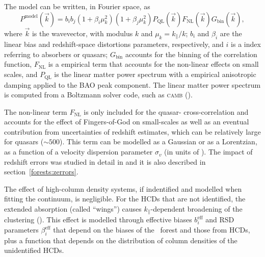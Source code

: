 The model can be written, in Fourier space, as 
\begin{equation}
    P^\mathrm{model}(\vec{k}) = b_i b_j 
        \left(1+\beta_i \mu^2_k\right) \left(1+\beta_j \mu^2_k\right) 
        P_\mathrm{ QL}(\vec{k}) F_\mathrm{NL}(\vec{k})G_\mathrm{ bin}(\vec{k}), 
    \label{eq:power_spectrum}
\end{equation}
where $\vec{k}$ is the wavevector, with modulus $k$ and $\mu_k = k_\parallel/k$;
$b_i$ and $\beta_i$ are the linear bias and redshift-space distortions parameters, respectively,
and $i$ is a index referring to absorbers or quasars; 
$G_\mathrm{ bin}$ accounts for the binning of the correlation function, 
$F_\mathrm{NL}$ is a empirical term that accounts for the non-linear effects on small scales, 
and $ P_\mathrm{ QL}$ is the linear matter power spectrum with a empirical anisotropic 
damping applied to the BAO peak component. 
The linear matter power spectrum is computed from a Boltzmann solver code, 
such as \textsc{camb} (\cite{lewisEfficientComputationCosmic2000}). 

The non-linear term $F_\mathrm{NL}$ is only included for the quasar-\lya 
cross-correlation and accounts for the effect of Fingers-of-God on small-scales as well as 
an eventual contribution from uncertainties of redshift estimates,
which can be relatively large for quasars ($\sim 500$\kms). 
This term can be modelled as a Gaussian or as a Lorentzian, as a function of a 
velocity dispersion parameter $\sigma_v$ (in units of \kms).
The impact of redshift errors was studied in detail in 
\cite{youlesEffectQuasarRedshift2022} and it is also described in 
section~\ref{forests:zerrors}.

The effect of high-column density systems, if indentified and modelled 
when fitting the continuum, is negligible. For the HCDs that are 
not identified, the extended absorption (called ``wings'') causes 
$k_\parallel$-dependent broadening of the clustering 
(\cite{font-riberaEffectHighColumn2012,
rogersCorrelationsThreedimensionalLymanalpha2018}). 
This effect is modelled through effective biases $b_i^\mathrm{eff}$ 
and RSD parameters $\beta_i^\mathrm{eff}$ that depend on the 
biases of the \lya\ forest and those from HCDs, plus a function 
that depends on the distribution of column densities of the unidentified 
HCDs. 

